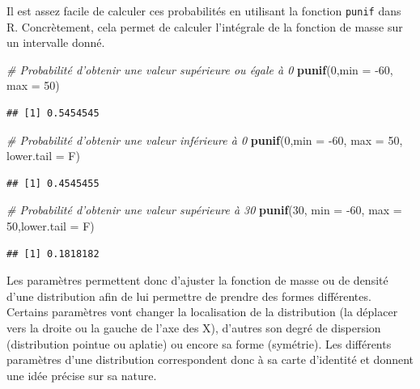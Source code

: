 \documentclass[
  11pt,
  french,
]{book}
\makeatletter
\newenvironment{Shaded}{\begin{snugshade}}{\end{snugshade}}
\newcommand{\CommentTok}[1]{\textcolor[rgb]{0.56,0.35,0.01}{\textit{#1}}}
\newcommand{\DataTypeTok}[1]{\textcolor[rgb]{0.13,0.29,0.53}{#1}}
\newcommand{\DecValTok}[1]{\textcolor[rgb]{0.00,0.00,0.81}{#1}}
\newcommand{\KeywordTok}[1]{\textcolor[rgb]{0.13,0.29,0.53}{\textbf{#1}}}
\newcommand{\NormalTok}[1]{#1}
\newenvironment{kframe}{%
\medskip{}
\setlength{\fboxsep}{.8em}
 \def\at@end@of@kframe{}%
 \ifinner\ifhmode%
  \def\at@end@of@kframe{\end{minipage}}%
  \begin{minipage}{\columnwidth}%
 \fi\fi%
 \def\FrameCommand##1{\hskip\@totalleftmargin \hskip-\fboxsep
 \colorbox{shadecolor}{##1}\hskip-\fboxsep
     \hskip-\linewidth \hskip-\@totalleftmargin \hskip\columnwidth}%
 \MakeFramed {\advance\hsize-\width
   \@totalleftmargin\z@ \linewidth\hsize
   \@setminipage}}%
 {\par\unskip\endMakeFramed%
 \at@end@of@kframe}
\renewenvironment{Shaded}{\begin{kframe}}{\end{kframe}}
\makeatother
\begin{document}
Il est assez facile de calculer ces probabilités en utilisant la fonction \texttt{punif} dans R. Concrètement, cela permet de calculer l'intégrale de la fonction de masse sur un intervalle donné.

\begin{Shaded}
\begin{Highlighting}[]
\CommentTok{# Probabilité d'obtenir une valeur supérieure ou égale à 0}
\KeywordTok{punif}\NormalTok{(}\DecValTok{0}\NormalTok{,}\DataTypeTok{min =} \DecValTok{-60}\NormalTok{, }\DataTypeTok{max =} \DecValTok{50}\NormalTok{)}
\end{Highlighting}
\end{Shaded}

\begin{verbatim}
## [1] 0.5454545
\end{verbatim}

\begin{Shaded}
\begin{Highlighting}[]
\CommentTok{# Probabilité d'obtenir une valeur inférieure à 0}
\KeywordTok{punif}\NormalTok{(}\DecValTok{0}\NormalTok{,}\DataTypeTok{min =} \DecValTok{-60}\NormalTok{, }\DataTypeTok{max =} \DecValTok{50}\NormalTok{, }\DataTypeTok{lower.tail =}\NormalTok{ F)}
\end{Highlighting}
\end{Shaded}

\begin{verbatim}
## [1] 0.4545455
\end{verbatim}

\begin{Shaded}
\begin{Highlighting}[]
\CommentTok{# Probabilité d'obtenir une valeur supérieure à 30}
\KeywordTok{punif}\NormalTok{(}\DecValTok{30}\NormalTok{, }\DataTypeTok{min =} \DecValTok{-60}\NormalTok{, }\DataTypeTok{max =} \DecValTok{50}\NormalTok{,}\DataTypeTok{lower.tail =}\NormalTok{ F)}
\end{Highlighting}
\end{Shaded}

\begin{verbatim}
## [1] 0.1818182
\end{verbatim}

Les paramètres permettent donc d'ajuster la fonction de masse ou de densité d'une distribution afin de lui permettre de prendre des formes différentes. Certains paramètres vont changer la localisation de la distribution (la déplacer vers la droite ou la gauche de l'axe des X), d'autres son degré de dispersion (distribution pointue ou aplatie) ou encore sa forme (symétrie). Les différents paramètres d'une distribution correspondent donc à sa carte d'identité et donnent une idée précise sur sa nature.
\end{document}
